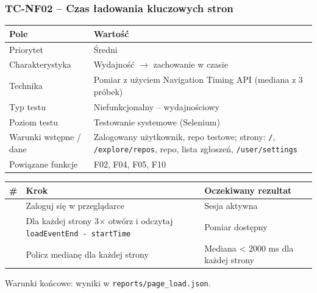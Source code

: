 \subsubsection{TC-NF02 – Czas ładowania kluczowych stron}
{\small
\par\smallskip\noindent\begin{tabular}{>{\raggedright\arraybackslash}p{}>{\raggedright\arraybackslash}p{}}
\toprule
\textbf{Pole} & \textbf{Wartość} \\
\midrule
Priorytet & Średni \\
Charakterystyka & Wydajność $\rightarrow$ zachowanie w czasie \\
Technika & Pomiar z użyciem Navigation Timing API (mediana z 3 próbek) \\
Typ testu & Niefunkcjonalny – wydajnościowy \\
Poziom testu & Testowanie systemowe (Selenium) \\
Warunki wstępne / dane & Zalogowany użytkownik, repo testowe; strony: \texttt{/\allowbreak{}}, \texttt{/\allowbreak{}explore/\allowbreak{}repos}, repo, lista zgłoszeń, \texttt{/\allowbreak{}user/\allowbreak{}settings} \\
Powiązane funkcje & F02, F04, F05, F10 \\
\bottomrule
\end{tabular}\par\smallskip
}
{\small
\par\smallskip\noindent\begin{tabular}{>{\raggedright\arraybackslash}p{}>{\raggedright\arraybackslash}p{}>{\raggedright\arraybackslash}p{}}
\toprule
\textbf{\#} & \textbf{Krok} & \textbf{Oczekiwany rezultat} \\
\midrule
1 & Zaloguj się w przeglądarce & Sesja aktywna \\
2 & Dla każdej strony 3$\times$ otwórz i odczytaj \texttt{loadEventEnd - startTime} & Pomiar dostępny \\
3 & Policz medianę dla każdej strony & Mediana < 2000 ms dla każdej strony \\
\bottomrule
\end{tabular}\par\smallskip
}
Warunki końcowe: wyniki w \texttt{reports/\allowbreak{}page\_\allowbreak{}load.json}.


